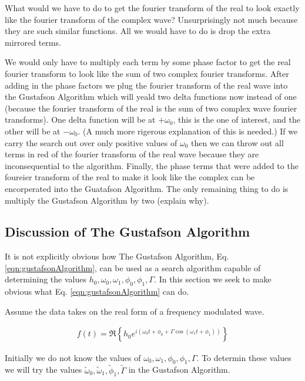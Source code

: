 \documentclass[onecolumn, groupedaddress, 10pt]{revtex4-1}
\begin{document}
What would we have to do to get the fourier transform of the real to look exactly like the fourier transform of the complex wave?  Unsurprisingly not much because they are such similar functions.  All we would have to do is drop the extra mirrored terms.


We would only have to multiply each term by some phase factor to get the real fourier transform to look like the sum of two complex fourier transforms.  After adding in the phase factors we plug the  fourier transform of the real wave into the Gustafson Algorithm which will yeald two delta functions now instead of one (because the fourier transform of the real is the sum of two complex wave fourier transforms).  One delta function will be at $+\omega_0$, this is the one of interest, and the other will be at $-\omega_0$.  (A much more rigerous explanation of this is needed.)  If we carry the search out over only positive values of $\omega_0$ then we can throw out all terms in red of the fourier transform of the real wave because they are inconsequential to the algorithm.  Finally, the phase terms that were added to the foureier transform of the real to make it look like the complex can be encorperated into the Guatafson Algorithm.  The only remaining thing to do is multiply the Gustafson Algorithm by two (explain why).


\subsection{Discussion of The Gustafson Algorithm}
It is not explicitly obvious how The Gustafson Algorithm, Eq. \ref{eqn:gustafsonAlgorithm}, can be used as a search algorithm capable of determining the values $h_0, \omega_0, \omega_1, \phi_0, \phi_1, \Gamma$.  In this section we seek to make obvious what Eq. \ref{eqn:gustafsonAlgorithm} can do.  

Assume the data takes on the real form of a frequency modulated wave.

\begin{align}
\label{eqn:realData}
f(t) = \Re \left\{ h_0 e^{i\left( \omega_0 t + \phi_0 + \Gamma \cos( \omega_1 t + \phi_1 ) \right)} \right\}
\end{align}

Initially we do not know the values of $\omega_0, \omega_1, \phi_0, \phi_1, \Gamma$.  To determin these values we will try the values $\widetilde{\omega}_0, \widetilde{\omega}_1, \widetilde{\phi}_1, \widetilde{\Gamma}$ in the Gustafson Algorithm.
\end{document}
